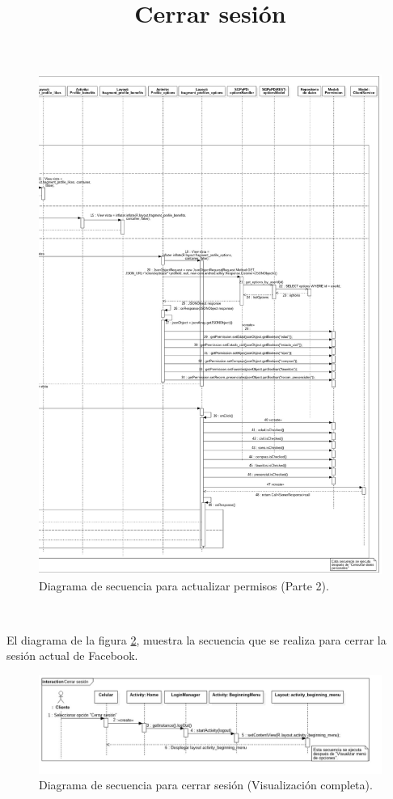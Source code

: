 \FloatBarrier
\begin{figure}[htbp!]
		\centering
			\includegraphics[width=.9 \textwidth]{imagenes/Diagramas_UserApp/Nuevos_diagramas/permisos2}
		\caption{Diagrama de secuencia para actualizar permisos (Parte 2).}
		\label{image:permisos3}
\end{figure}
\FloatBarrier

\title{\textbf{Cerrar sesión}}
\\ \par
El diagrama de la figura \ref{image:cerrar}, muestra la secuencia que se realiza para cerrar la sesión actual de Facebook.
\FloatBarrier
\begin{figure}[htbp!]
		\centering
			\includegraphics[width=1.1 \textwidth]{imagenes/Diagramas_UserApp/Nuevos_diagramas/cerrarSesion}
		\caption{Diagrama de secuencia para cerrar sesión (Visualización completa).}
		\label{image:cerrar}
\end{figure}
\FloatBarrier

